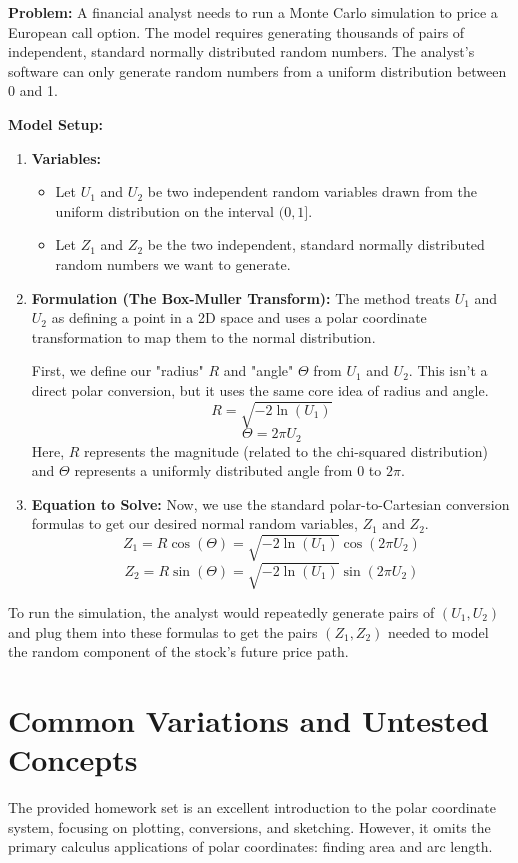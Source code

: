 \documentclass{article}
\begin{document}
\textbf{Problem:} A financial analyst needs to run a Monte Carlo simulation to price a European call option. The model requires generating thousands of pairs of independent, standard normally distributed random numbers. The analyst's software can only generate random numbers from a uniform distribution between 0 and 1.

\textbf{Model Setup:}
\begin{enumerate}
    \item \textbf{Variables:}
    \begin{itemize}
        \item Let \(U_1\) and \(U_2\) be two independent random variables drawn from the uniform distribution on the interval \((0, 1]\).
        \item Let \(Z_1\) and \(Z_2\) be the two independent, standard normally distributed random numbers we want to generate.
    \end{itemize}

    \item \textbf{Formulation (The Box-Muller Transform):} The method treats \(U_1\) and \(U_2\) as defining a point in a 2D space and uses a polar coordinate transformation to map them to the normal distribution.
    
    First, we define our "radius" \(R\) and "angle" \(\Theta\) from \(U_1\) and \(U_2\). This isn't a direct polar conversion, but it uses the same core idea of radius and angle.
    \[ R = \sqrt{-2 \ln(U_1)} \]
    \[ \Theta = 2\pi U_2 \]
    Here, \(R\) represents the magnitude (related to the chi-squared distribution) and \(\Theta\) represents a uniformly distributed angle from 0 to \(2\pi\).

    \item \textbf{Equation to Solve:} Now, we use the standard polar-to-Cartesian conversion formulas to get our desired normal random variables, \(Z_1\) and \(Z_2\).
    \[ Z_1 = R \cos(\Theta) = \sqrt{-2 \ln(U_1)} \cos(2\pi U_2) \]
    \[ Z_2 = R \sin(\Theta) = \sqrt{-2 \ln(U_1)} \sin(2\pi U_2) \]
\end{enumerate}
To run the simulation, the analyst would repeatedly generate pairs of \((U_1, U_2)\) and plug them into these formulas to get the pairs \((Z_1, Z_2)\) needed to model the random component of the stock's future price path.

\part{Common Variations and Untested Concepts}
The provided homework set is an excellent introduction to the polar coordinate system, focusing on plotting, conversions, and sketching. However, it omits the primary calculus applications of polar coordinates: finding area and arc length.
\end{document}
